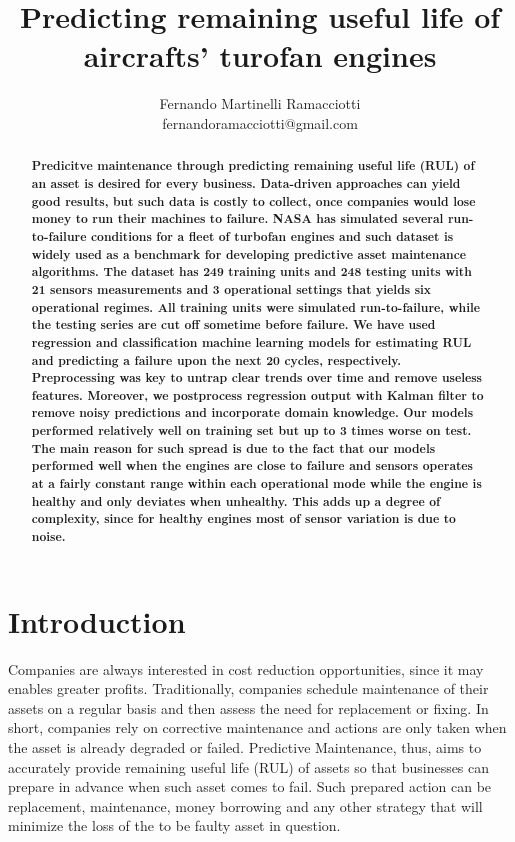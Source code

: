 \documentclass[letterpaper, 10 pt, conference, onecolumn]{ieeeconf}  %
\title{\LARGE \bf
Predicting remaining useful life of aircrafts' turofan engines}
\author{Fernando Martinelli Ramacciotti \\ 
fernandoramacciotti@gmail.com%
}
\begin{document}
\maketitle
\thispagestyle{plain}
\pagestyle{plain}


\begin{abstract}

\textbf{
Predicitve maintenance through predicting remaining useful life (RUL) of an asset is desired for every business. Data-driven approaches can yield good results, but such data is costly to collect, once companies would lose money to run their machines to failure. NASA has simulated several run-to-failure conditions for a fleet of turbofan engines and such dataset is widely used as a benchmark for developing predictive asset maintenance algorithms. The dataset has 249 training units and 248 testing units with 21 sensors measurements and 3 operational settings that yields six operational regimes. All training units were simulated run-to-failure, while the testing series are cut off sometime before failure. We have used regression and classification machine learning models for estimating RUL and predicting a failure upon the next 20 cycles, respectively. Preprocessing was key to untrap clear trends over time and remove useless features. Moreover, we postprocess regression output with Kalman filter to remove noisy predictions and incorporate domain knowledge. Our models performed relatively well on training set but up to 3 times worse on test. The main reason for such spread is due to the fact that our models performed well when the engines are close to failure and sensors operates at a fairly constant range within each operational mode while the engine is healthy and only deviates when unhealthy. This adds up a degree of complexity, since for healthy engines most of sensor variation is due to noise.
}
\end{abstract}

\section{Introduction}
Companies are always interested in cost reduction opportunities, since it may enables greater profits. Traditionally, companies schedule maintenance of their assets on a regular basis and then assess the need for replacement or fixing. In short, companies rely on corrective maintenance and actions are only taken when the asset is already degraded or failed. Predictive Maintenance, thus, aims to accurately provide remaining useful life (RUL) of assets so that businesses can prepare in advance when such asset comes to fail. Such prepared action can be replacement, maintenance, money borrowing and any other strategy that will minimize the loss of the to be faulty asset in question. 
\end{document}
